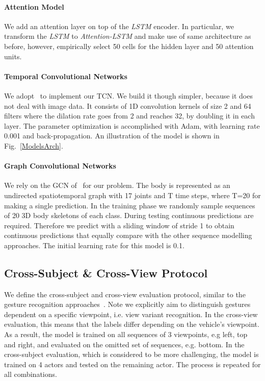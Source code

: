 \documentclass[letterpaper, 10 pt, conference]{ieeeconf}
\begin{document}
\paragraph{Attention Model}

We add an attention layer on top of the \emph{LSTM} encoder. In particular, we transform the \emph{LSTM} to \emph{Attention-LSTM} and make use of same architecture as before, however, empirically select 50 cells for the hidden layer and 50 attention units.

\paragraph{Temporal Convolutional Networks}

We adopt~\cite{Lea2017TemporalDetection} to implement our TCN. We build it though simpler, because it does not deal with image data. It consists of 1D convolution kernels of size 2 and 64 filters where the dilation rate goes from 2 and reaches 32, by doubling it in each layer. The parameter optimization is accomplished with Adam, with learning rate 0.001 and back-propagation. An illustration of the model is shown in Fig.~\ref{ModelsArch}.

\paragraph{Graph Convolutional Networks}

We rely on the GCN of~\cite{Li2019SpatialRecognition} for our problem. The body is represented as an undirected spatiotemporal graph with 17 joints and T time steps, where T=20 for making a single prediction. In the training phase we randomly sample sequences of 20 3D body skeletons of each class. During testing continuous predictions are required. Therefore we predict with a sliding window of stride 1 to obtain continuous predictions that equally compare with the other sequence modelling approaches. The initial learning rate for this model is 0.1.

\subsection{Cross-Subject \& Cross-View Protocol}

We define the cross-subject and cross-view evaluation protocol, similar to the gesture recognition approaches~\cite{Shahroudy2016NTUAnalysis}. Note we explicitly aim to distinguish gestures dependent on a specific viewpoint, i.e. view variant recognition. In the cross-view evaluation, this means that the labels differ depending on the vehicle's viewpoint. As a result, the model is trained on all sequences of 3 viewpoints, e.g left, top and right, and evaluated on the omitted set of sequences, e.g. bottom. In the cross-subject evaluation, which is considered to be more challenging, the model is trained on 4 actors and tested on the remaining actor. The process is repeated for all combinations.
\end{document}
